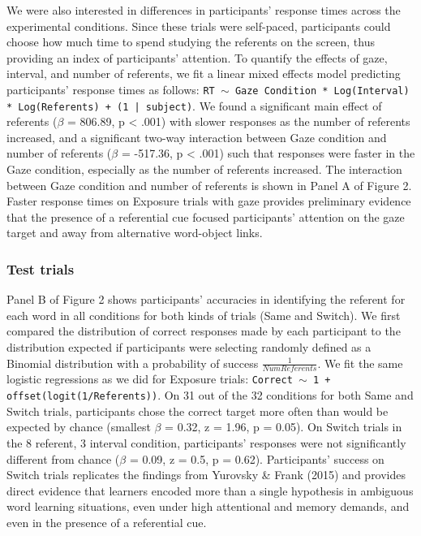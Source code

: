 \documentclass[authoryear, review]{elsarticle}
\begin{document}
We were also interested in differences in participants' response times
across the experimental conditions. Since these trials were self-paced,
participants could choose how much time to spend studying the referents
on the screen, thus providing an index of participants' attention. To
quantify the effects of gaze, interval, and number of referents, we fit
a linear mixed effects model predicting participants' response times as
follows:
\texttt{RT $\sim$ Gaze Condition * Log(Interval) * Log(Referents) + (1 | subject)}.
We found a significant main effect of referents (\(\beta\) = 806.89, p
\textless{} .001) with slower responses as the number of referents
increased, and a significant two-way interaction between Gaze condition
and number of referents (\(\beta\) = -517.36, p \textless{} .001) such
that responses were faster in the Gaze condition, especially as the
number of referents increased. The interaction between Gaze condition
and number of referents is shown in Panel A of Figure 2. Faster response
times on Exposure trials with gaze provides preliminary evidence that
the presence of a referential cue focused participants' attention on the
gaze target and away from alternative word-object links.

\subsubsection{Test trials}\label{test-trials}

Panel B of Figure 2 shows participants' accuracies in identifying the
referent for each word in all conditions for both kinds of trials (Same
and Switch). We first compared the distribution of correct responses
made by each participant to the distribution expected if participants
were selecting randomly defined as a Binomial distribution with a
probability of success \(\frac{1}{Num Referents}\). We fit the same
logistic regressions as we did for Exposure trials:
\texttt{Correct $\sim$ 1 + offset(logit(1/Referents))}. On 31 out of the
32 conditions for both Same and Switch trials, participants chose the
correct target more often than would be expected by chance (smallest
\(\beta\) = 0.32, z = 1.96, p = 0.05). On Switch trials in the 8
referent, 3 interval condition, participants' responses were not
significantly different from chance (\(\beta\) = 0.09, z = 0.5, p =
0.62). Participants' success on Switch trials replicates the findings
from Yurovsky \& Frank (2015) and provides direct evidence that learners
encoded more than a single hypothesis in ambiguous word learning
situations, even under high attentional and memory demands, and even in
the presence of a referential cue.
\end{document}
